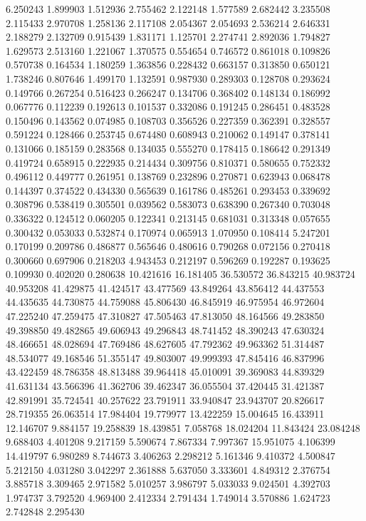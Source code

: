 6.250243
1.899903
1.512936
2.755462
2.122148
1.577589
2.682442
3.235508
2.115433
2.970708
1.258136
2.117108
2.054367
2.054693
2.536214
2.646331
2.188279
2.132709
0.915439
1.831171
1.125701
2.274741
2.892036
1.794827
1.629573
2.513160
1.221067
1.370575
0.554654
0.746572
0.861018
0.109826
0.570738
0.164534
1.180259
1.363856
0.228432
0.663157
0.313850
0.650121
1.738246
0.807646
1.499170
1.132591
0.987930
0.289303
0.128708
0.293624
0.149766
0.267254
0.516423
0.266247
0.134706
0.368402
0.148134
0.186992
0.067776
0.112239
0.192613
0.101537
0.332086
0.191245
0.286451
0.483528
0.150496
0.143562
0.074985
0.108703
0.356526
0.227359
0.362391
0.328557
0.591224
0.128466
0.253745
0.674480
0.608943
0.210062
0.149147
0.378141
0.131066
0.185159
0.283568
0.134035
0.555270
0.178415
0.186642
0.291349
0.419724
0.658915
0.222935
0.214434
0.309756
0.810371
0.580655
0.752332
0.496112
0.449777
0.261951
0.138769
0.232896
0.270871
0.623943
0.068478
0.144397
0.374522
0.434330
0.565639
0.161786
0.485261
0.293453
0.339692
0.308796
0.538419
0.305501
0.039562
0.583073
0.638390
0.267340
0.703048
0.336322
0.124512
0.060205
0.122341
0.213145
0.681031
0.313348
0.057655
0.300432
0.053033
0.532874
0.170974
0.065913
1.070950
0.108414
5.247201
0.170199
0.209786
0.486877
0.565646
0.480616
0.790268
0.072156
0.270418
0.300660
0.697906
0.218203
4.943453
0.212197
0.596269
0.192287
0.193625
0.109930
0.402020
0.280638
10.421616
16.181405
36.530572
36.843215
40.983724
40.953208
41.429875
41.424517
43.477569
43.849264
43.856412
44.437553
44.435635
44.730875
44.759088
45.806430
46.845919
46.975954
46.972604
47.225240
47.259475
47.310827
47.505463
47.813050
48.164566
49.283850
49.398850
49.482865
49.606943
49.296843
48.741452
48.390243
47.630324
48.466651
48.028694
47.769486
48.627605
47.792362
49.963362
51.314487
48.534077
49.168546
51.355147
49.803007
49.999393
47.845416
46.837996
43.422459
48.786358
48.813488
39.964418
45.010091
39.369083
44.839329
41.631134
43.566396
41.362706
39.462347
36.055504
37.420445
31.421387
42.891991
35.724541
40.257622
23.791911
33.940847
23.943707
20.826617
28.719355
26.063514
17.984404
19.779977
13.422259
15.004645
16.433911
12.146707
9.884157
19.258839
18.439851
7.058768
18.024204
11.843424
23.084248
9.688403
4.401208
9.217159
5.590674
7.867334
7.997367
15.951075
4.106399
14.419797
6.980289
8.744673
3.406263
2.298212
5.161346
9.410372
4.500847
5.212150
4.031280
3.042297
2.361888
5.637050
3.333601
4.849312
2.376754
3.885718
3.309465
2.971582
5.010257
3.986797
5.033033
9.024501
4.392703
1.974737
3.792520
4.969400
2.412334
2.791434
1.749014
3.570886
1.624723
2.742848
2.295430

